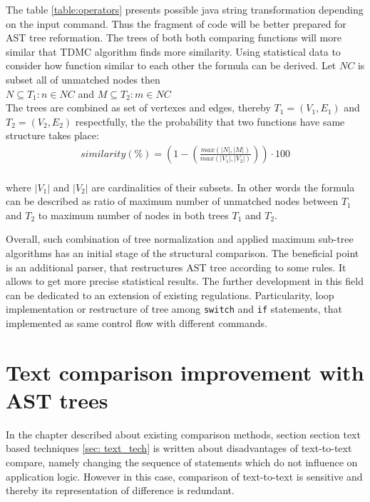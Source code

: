 \documentclass{report}
\begin{document}
The table \ref{table:operators} presents possible java string transformation depending on the input command. Thus the fragment of code will be better prepared for AST tree reformation. The trees of both both comparing functions will more similar that TDMC algorithm finds more similarity. Using statistical data to consider how function similar to each other the formula can be derived. Let $NC$ is subset all of unmatched nodes then\\
$ N \subseteq T_{1}: n \in NC $ and $ M \subseteq T_{2}: m \in NC $ \\
The trees are combined as set of vertexes and edges, thereby $T_{1} = (V_{1}, E_{1})$ and $T_{2} = (V_{2}, E_{2})$ respectfully, the the probability that two functions have same structure takes place: \\
\begin{gather*}
similarity(\%) =  \left ( 1 - \left (\frac{max(|N|, |M|)}{max(|V_{1}|, |V_{2}|)} \right ) \right )\cdot 100 
\end{gather*} \\
where $|V_{1}|$ and $|V_{2}|$ are cardinalities of their subsets. In other words the formula can be described as ratio of maximum number of unmatched nodes between $T_{1}$ and $T_{2}$ to maximum number of nodes in both trees $T_{1}$ and $T_{2}$. 

Overall, such combination of tree normalization and applied maximum sub-tree algorithms has an initial stage of the structural comparison. The beneficial point is an additional parser, that restructures AST tree according to some rules. It allows to get more precise statistical results. The further development in this field can be dedicated to an extension of existing regulations. Particularity, loop implementation or restructure of tree among \texttt{switch} and \texttt{if} statements, that implemented as same control flow with different commands. 


\chapter{Text comparison improvement with AST trees}
\label{cha:text-improvement}

In the chapter described about existing comparison methods, section section text based techniques \ref{sec: text_tech} is written about disadvantages of text-to-text compare, namely changing the sequence of statements which do not influence on application logic. However in this case, comparison of text-to-text is sensitive  and thereby its representation of difference is redundant.
\end{document}
